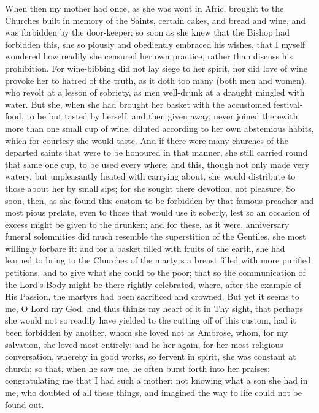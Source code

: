 \documentclass[b5paper,openright,12pt,twoside]{book}
\begin{document}
When then my mother had once, as she was wont in Afric, brought to the
Churches built in memory of the Saints, certain cakes, and bread and
wine, and was forbidden by the door-keeper; so soon as she knew that the
Bishop had forbidden this, she so piously and obediently embraced
his wishes, that I myself wondered how readily she censured her own
practice, rather than discuss his prohibition. For wine-bibbing did not
lay siege to her spirit, nor did love of wine provoke her to hatred of
the truth, as it doth too many (both men and women), who revolt at a
lesson of sobriety, as men well-drunk at a draught mingled with
water. But she, when she had brought her basket with the accustomed
festival-food, to be but tasted by herself, and then given away, never
joined therewith more than one small cup of wine, diluted according to
her own abstemious habits, which for courtesy she would taste. And if
there were many churches of the departed saints that were to be honoured
in that manner, she still carried round that same one cup, to be
used every where; and this, though not only made very watery, but
unpleasantly heated with carrying about, she would distribute to those
about her by small sips; for she sought there devotion, not pleasure.
So soon, then, as she found this custom to be forbidden by that famous
preacher and most pious prelate, even to those that would use it
soberly, lest so an occasion of excess might be given to the drunken;
and for these, as it were, anniversary funeral solemnities did much
resemble the superstition of the Gentiles, she most willingly forbare
it: and for a basket filled with fruits of the earth, she had learned to
bring to the Churches of the martyrs a breast filled with more
purified petitions, and to give what she could to the poor; that so
the communication of the Lord's Body might be there rightly celebrated,
where, after the example of His Passion, the martyrs had been sacrificed
and crowned. But yet it seems to me, O Lord my God, and thus thinks my
heart of it in Thy sight, that perhaps she would not so readily have
yielded to the cutting off of this custom, had it been forbidden by
another, whom she loved not as Ambrose, whom, for my salvation,
she loved most entirely; and he her again, for her most religious
conversation, whereby in good works, so fervent in spirit, she was
constant at church; so that, when he saw me, he often burst forth into
her praises; congratulating me that I had such a mother; not knowing
what a son she had in me, who doubted of all these things, and imagined
the way to life could not be found out.
\end{document}
